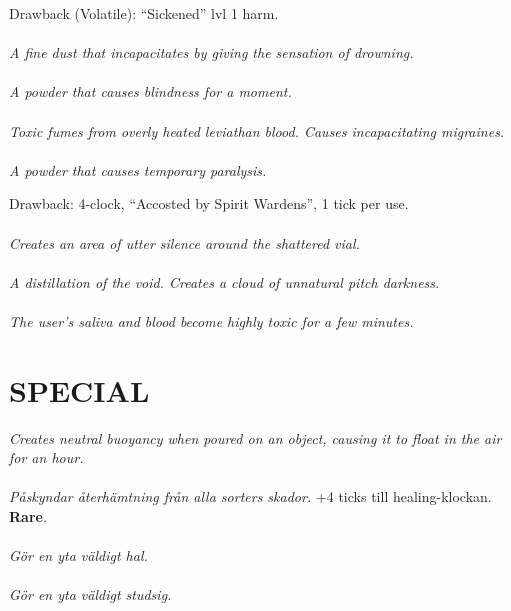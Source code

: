 \documentclass{article}
\begin{document}
\begin{multicols*}{3}
Drawback (Volatile): ``Sickened'' lvl 1 harm.
\\\\
\textit{A fine dust that incapacitates by giving the sensation of drowning.}
\\\\
\textit{A powder that causes blindness for a moment.}
\\\\
\textit{Toxic fumes from overly heated leviathan blood.
Causes incapacitating migraines.}
\\\\
\textit{A powder that causes temporary paralysis.}


Drawback: 4-clock, ``Accosted by Spirit Wardens'', 1 tick per use.
\\\\
\textit{Creates an area of utter silence around the shattered vial.}
\HasAmount
\\\\
\textit{A distillation of the void.
Creates a cloud of unnatural pitch darkness.}
\HasAmount
\\\\
\textit{The user's saliva and blood become highly toxic for a few minutes.}
\HasAmount


\section*{\uppercase{Special}}
\textit{Creates neutral buoyancy when poured on an object, causing it to float in the air for an hour.}
\\\\
\textit{Påskyndar återhämtning från alla sorters skador.}
+4 ticks till healing-klockan.
\textbf{Rare}.
\HasAmountRare
\\\\
\textit{Gör en yta väldigt hal.}
\\\\
\textit{Gör en yta väldigt studsig.}
\HasAmount



\end{multicols*}
\end{document}
